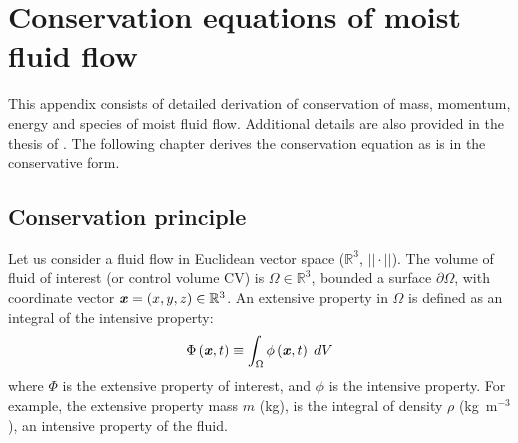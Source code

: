 \chapter{Conservation equations of moist fluid flow}
\label{app:conservation}

This appendix consists of detailed derivation of conservation of mass, momentum, energy and species of moist fluid flow. Additional details are also provided in the thesis of \cite{Defraeye2011}. The following chapter derives the conservation equation as is in the conservative form. 

\section{Conservation principle}

Let us consider a fluid flow in Euclidean vector space ($\mathbb{R}^3$, $||\cdot||$). The volume of fluid of interest (or control volume CV) is $\Omega \in \mathbb{R}^3$, bounded a surface $\partial\Omega$, with coordinate vector $\textbf{\textit{x}} = (x,y,z) \in \mathbb{R}^3$. An extensive property in $\Omega$ is defined as an integral of the intensive property:
\begin{equation}
\Phi \left( \textbf{\textit{x}},t \right) \equiv \int_\Omega  \phi  \left( \textbf{\textit{x}},t \right)\;dV
\end{equation}
where $\Phi$ is the extensive property of interest, and $\phi$ is the intensive property. For example, the extensive property mass $m$ (kg), is the integral of density $\rho$ (kg~m$^{-3}$), an intensive property of the fluid. 

